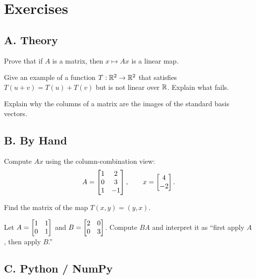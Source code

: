 \section*{Exercises}

\subsection*{A. Theory}

\begin{exercise}
Prove that if $A$ is a matrix, then $x\mapsto Ax$ is a linear map.
\end{exercise}

\begin{exercise}
Give an example of a function $T:\mathbb{R}^2\to\mathbb{R}^2$ that satisfies
$T(u+v)=T(u)+T(v)$ but is not linear over $\mathbb{R}$. Explain what fails.
\end{exercise}

\begin{exercise}
Explain why the columns of a matrix are the images of the standard basis
vectors.
\end{exercise}

\subsection*{B. By Hand}

\begin{exercise}
Compute $Ax$ using the column-combination view:
\[
  A=\begin{bmatrix}1&2\\0&3\\1&-1\end{bmatrix},\qquad x=\begin{bmatrix}4\\-2\end{bmatrix}.
\]
\end{exercise}

\begin{exercise}
Find the matrix of the map $T(x,y)=(y,x)$.
\end{exercise}

\begin{exercise}
Let $A=\begin{bmatrix}1&1\\0&1\end{bmatrix}$ and $B=\begin{bmatrix}2&0\\0&3\end{bmatrix}$. Compute $BA$ and interpret it
as ``first apply $A$, then apply $B$.''
\end{exercise}

\subsection*{C. Python / NumPy}

